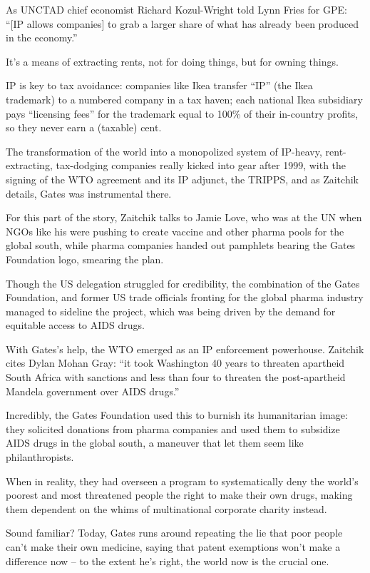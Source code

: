 \documentclass[
]{book}
\begin{document}
As UNCTAD chief economist Richard Kozul-Wright told Lynn Fries for GPE: ``{[}IP allows companies{]} to grab a larger share of what has already been produced in the economy.''

It's a means of extracting rents, not for doing things, but for owning things.

IP is key to tax avoidance: companies like Ikea transfer ``IP'' (the Ikea trademark) to a numbered company in a tax haven; each national Ikea subsidiary pays ``licensing fees'' for the trademark equal to 100\% of their in-country profits, so they never earn a (taxable) cent.

The transformation of the world into a monopolized system of IP-heavy, rent-extracting, tax-dodging companies really kicked into gear after 1999, with the signing of the WTO agreement and its IP adjunct, the TRIPPS, and as Zaitchik details, Gates was instrumental there.

For this part of the story, Zaitchik talks to Jamie Love, who was at the UN when NGOs like his were pushing to create vaccine and other pharma pools for the global south, while pharma companies handed out pamphlets bearing the Gates Foundation logo, smearing the plan.

Though the US delegation struggled for credibility, the combination of the Gates Foundation, and former US trade officials fronting for the global pharma industry managed to sideline the project, which was being driven by the demand for equitable access to AIDS drugs.

With Gates's help, the WTO emerged as an IP enforcement powerhouse. Zaitchik cites Dylan Mohan Gray: ``it took Washington 40 years to threaten apartheid South Africa with sanctions and less than four to threaten the post-apartheid Mandela government over AIDS drugs.''

Incredibly, the Gates Foundation used this to burnish its humanitarian image: they solicited donations from pharma companies and used them to subsidize AIDS drugs in the global south, a maneuver that let them seem like philanthropists.

When in reality, they had overseen a program to systematically deny the world's poorest and most threatened people the right to make their own drugs, making them dependent on the whims of multinational corporate charity instead.

Sound familiar? Today, Gates runs around repeating the lie that poor people can't make their own medicine, saying that patent exemptions won't make a difference now -- to the extent he's right, the world now is the crucial one.
\end{document}
